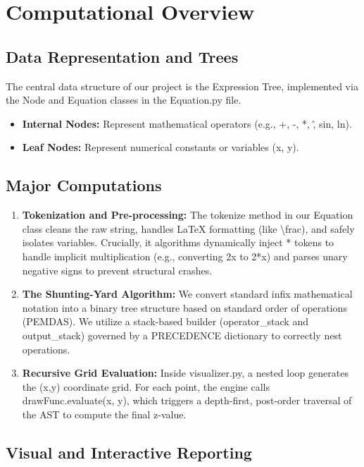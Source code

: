 \documentclass{article}
\begin{document}
\section{\textbf{Computational Overview}}

\subsection{\textbf{Data Representation and Trees}}

The central data structure of our project is the Expression Tree, implemented via the Node and Equation classes in the Equation.py file.

\begin{itemize}
    \item \textbf{Internal Nodes:} Represent mathematical operators (e.g., +, -, *, \^, sin, ln).
    \item \textbf{Leaf Nodes:} Represent numerical constants or variables (x, y).
\end{itemize}

\subsection{\textbf{Major Computations}}

\begin{enumerate}
    \item \textbf{Tokenization and Pre-processing:} The tokenize method in our Equation class cleans the raw string, handles LaTeX formatting (like \textbackslash{}frac), and safely isolates variables. Crucially, it algorithms dynamically inject * tokens to handle implicit multiplication (e.g., converting 2x to 2*x) and parses unary negative signs to prevent structural crashes.
    \item \textbf{The Shunting-Yard Algorithm:} We convert standard infix mathematical notation into a binary tree structure based on standard order of operations (PEMDAS). We utilize a stack-based builder (operator\_stack and output\_stack) governed by a PRECEDENCE dictionary to correctly nest operations.
    \item \textbf{Recursive Grid Evaluation:} Inside visualizer.py, a nested loop generates the (x,y) coordinate grid. For each point, the engine calls drawFunc.evaluate(x, y), which triggers a depth-first, post-order traversal of the AST to compute the final z-value.
\end{enumerate}

\subsection{\textbf{Visual and Interactive Reporting}}
\end{document}
